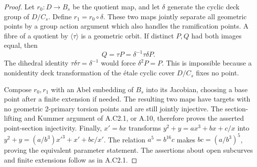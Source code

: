 \begin{proof}
Let $r_0:D\to B_s$ be the quotient map, and let $\delta$ generate
the cyclic deck group of $D/C_s$. Define $r_1=r_0\circ\delta$.
These two maps jointly separate all geometric points by a group
action argument which also handles the ramification points.
A fibre of a quotient by $\langle\tau\rangle$ is a geometric
orbit. If distinct $P,Q$ had both images equal, then
\[
             Q=\tau P=\delta^{-1}\tau\delta P.
\]
The dihedral identity $\tau\delta\tau=\delta^{-1}$ would force
$\delta^2P=P$. This is impossible because a nonidentity deck
transformation of the \'etale cyclic cover $D/C_s$ fixes no point.

Compose $r_0,r_1$ with an Abel embedding of $B_s$ into its
Jacobian, choosing a base point after a finite extension if needed.
The resulting two maps have targets with no geometric
$2$-primary torsion points and are still jointly injective.
The section-lifting and Kummer argument of A.C2.1, or A.10,
therefore proves the asserted point-section injectivity. Finally,
$x'=b x$ transforms $y^2+y=a x^3+b x+c/x$ into
$y^2+y=(a/b^3)x'^3+x'+bc/x'$. The relation
$a^5=b^{16}c$ makes $bc=(a/b^3)^5$, proving the equivalent
parameter statement. The assertions about open subcurves and
finite extensions follow as in A.C2.1.
\end{proof}
